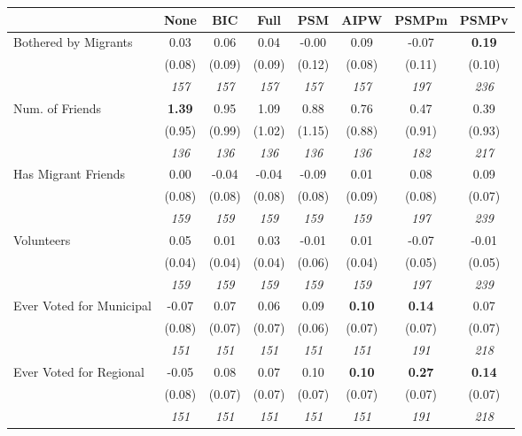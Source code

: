 \begin{tabular}{l c c c c c c c}
\toprule
 & None & BIC & Full & PSM & AIPW & PSMPm & PSMPv \\
\midrule
Bothered by Migrants & 0.03 & 0.06 & 0.04 & -0.00 & 0.09 & -0.07 & \textbf{0.19} \\
& (0.08) & (0.09) & (0.09) & (0.12) & (0.08) & (0.11) & (0.10) \\
& \textit{ 157 } & \textit{ 157 } & \textit{ 157 } & \textit{ 157 } & \textit{ 157 } & \textit{ 197 } & \textit{ 236 } \\
Num. of Friends & \textbf{ 1.39 } & 0.95 & 1.09 & 0.88 & 0.76 & 0.47 & 0.39 \\
& (0.95) & (0.99) & (1.02) & (1.15) & (0.88) & (0.91) & (0.93) \\
& \textit{ 136 } & \textit{ 136 } & \textit{ 136 } & \textit{ 136 } & \textit{ 136 } & \textit{ 182 } & \textit{ 217 } \\
Has Migrant Friends & 0.00 & -0.04 & -0.04 & -0.09 & 0.01 & 0.08 & 0.09 \\
& (0.08) & (0.08) & (0.08) & (0.08) & (0.09) & (0.08) & (0.07) \\
& \textit{ 159 } & \textit{ 159 } & \textit{ 159 } & \textit{ 159 } & \textit{ 159 } & \textit{ 197 } & \textit{ 239 } \\
Volunteers & 0.05 & 0.01 & 0.03 & -0.01 & 0.01 & -0.07 & -0.01 \\
& (0.04) & (0.04) & (0.04) & (0.06) & (0.04) & (0.05) & (0.05) \\
& \textit{ 159 } & \textit{ 159 } & \textit{ 159 } & \textit{ 159 } & \textit{ 159 } & \textit{ 197 } & \textit{ 239 } \\
Ever Voted for Municipal & -0.07 & 0.07 & 0.06 & 0.09 & \textbf{0.10} & \textbf{0.14} & 0.07 \\
& (0.08) & (0.07) & (0.07) & (0.06) & (0.07) & (0.07) & (0.07) \\
& \textit{ 151 } & \textit{ 151 } & \textit{ 151 } & \textit{ 151 } & \textit{ 151 } & \textit{ 191 } & \textit{ 218 } \\
Ever Voted for Regional & -0.05 & 0.08 & 0.07 & 0.10 & \textbf{0.10} & \textbf{0.27} & \textbf{0.14} \\
& (0.08) & (0.07) & (0.07) & (0.07) & (0.07) & (0.07) & (0.07) \\
& \textit{ 151 } & \textit{ 151 } & \textit{ 151 } & \textit{ 151 } & \textit{ 151 } & \textit{ 191 } & \textit{ 218 } \\
\bottomrule
\end{tabular}
